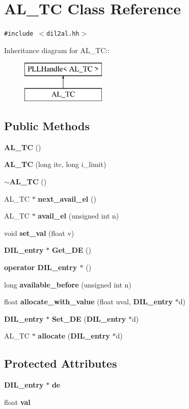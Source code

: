 \section{AL\_\-TC  Class Reference}
\label{classAL__TC}
{\tt \#include $<$dil2al.hh$>$}

Inheritance diagram for AL\_\-TC::\begin{figure}[H]
\begin{center}
\leavevmode
\includegraphics[height=2cm]{classAL__TC}
\end{center}
\end{figure}
\subsection*{Public Methods}
\begin{CompactItemize}
\item 
{\bf AL\_\-TC} ()
\item 
{\bf AL\_\-TC} (long itc, long i\_\-limit)
\item 
{\bf $\sim$AL\_\-TC} ()
\item 
AL\_\-TC $\ast$ {\bf next\_\-avail\_\-el} ()
\item 
AL\_\-TC $\ast$ {\bf avail\_\-el} (unsigned int n)
\item 
void {\bf set\_\-val} (float v)
\item 
{\bf DIL\_\-entry} $\ast$ {\bf Get\_\-DE} ()
\item 
{\bf operator DIL\_\-entry $\ast$} ()
\item 
long {\bf available\_\-before} (unsigned int n)
\item 
float {\bf allocate\_\-with\_\-value} (float uval, {\bf DIL\_\-entry} $\ast$d)
\item 
{\bf DIL\_\-entry} $\ast$ {\bf Set\_\-DE} ({\bf DIL\_\-entry} $\ast$d)
\item 
AL\_\-TC $\ast$ {\bf allocate} ({\bf DIL\_\-entry} $\ast$d)
\end{CompactItemize}
\subsection*{Protected Attributes}
\begin{CompactItemize}
\item 
{\bf DIL\_\-entry} $\ast$ {\bf de}
\item 
float {\bf val}
\end{CompactItemize}


